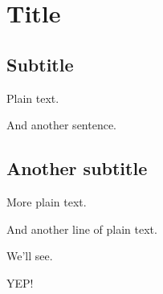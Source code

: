 \documentclass{article}
\begin{document}
\section{Title}



\subsection{Subtitle}

Plain text.

And another sentence.

\subsection{Another subtitle}

More plain text.

And another line of plain text.

We'll see.

YEP!
\end{document}
